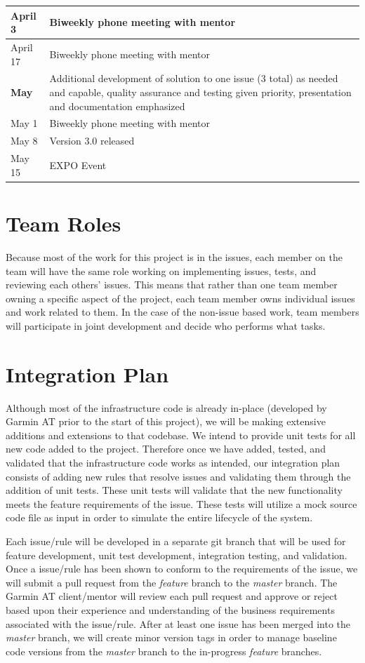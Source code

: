 \documentclass[11pt]{scrreprt}
\begin{document}
\begin{longtable}{| p{} | p{} |}
\hline
April 3 & Biweekly phone meeting with mentor\\
\hline
April 17 & Biweekly phone meeting with mentor\\
\hline
\textbf{May} & Additional development of solution to one issue (3 total) as needed and capable, quality assurance and testing given priority, presentation and documentation emphasized\\
\hline
May 1 & Biweekly phone meeting with mentor\\
\hline
May 8 & Version 3.0 released\\
\hline
May 15 & EXPO Event\\
\hline
\end{longtable}

\section{Team Roles}

Because most of the work for this project is in the issues, each member on the team will have the same role working on implementing issues, tests, and reviewing each others' issues. This means that rather than one team member owning a specific aspect of the project, each team member owns individual issues and work related to them. In the case of the non-issue based work, team members will participate in joint development and decide who performs what tasks.

\section{Integration Plan}

Although most of the infrastructure code is already in-place (developed by Garmin AT prior to the start of this project), we will be making extensive additions and extensions to that codebase. We intend to provide unit tests for all new code added to the project. Therefore once we have added, tested, and validated that the infrastructure code works as intended, our integration plan consists of adding new rules that resolve issues and validating them through the addition of unit tests. These unit tests will validate that the new functionality meets the feature requirements of the issue. These tests will utilize a mock source code file as input in order to simulate the entire lifecycle of the system.

Each issue/rule will be developed in a separate git branch that will be used for feature development, unit test development, integration testing, and validation. Once a issue/rule has been shown to conform to the requirements of the issue, we will submit a pull request from the \textit{feature} branch to the \textit{master} branch. The Garmin AT client/mentor will review each pull request and approve or reject based upon their experience and understanding of the business requirements associated with the issue/rule. After at least one issue has been merged into the \textit{master} branch, we will create minor version tags in order to manage baseline code versions from the \textit{master} branch to the in-progress \textit{feature} branches.
\end{document}
